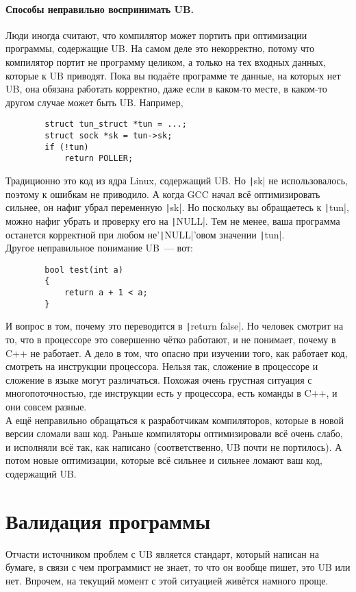 \documentclass{article}
\begin{document}
    \paragraph{Способы неправильно воспринимать UB.}
    Люди иногда считают, что компилятор может портить при оптимизации программы, содержащие UB. На самом деле это некорректно, потому что компилятор портит не программу целиком, а только на тех входных данных, которые к UB приводят. Пока вы подаёте программе те данные, на которых нет UB, она обязана работать корректно, даже если в каком-то месте, в каком-то другом случае может быть UB. Например,
    \begin{verbatim}
        struct tun_struct *tun = ...;
        struct sock *sk = tun->sk;
        if (!tun)
            return POLLER;
    \end{verbatim}
    Традиционно это код из ядра Linux, содержащий UB. Но \texttt|sk| не использовалось, поэтому к ошибкам не приводило. А когда GCC начал всё оптимизировать сильнее, он нафиг убрал переменную \texttt|sk|. Но поскольку вы обращаетесь к \texttt|tun|, можно нафиг убрать и проверку его на \texttt|NULL|. Тем не менее, ваша программа останется корректной при любом не'\texttt|NULL|'овом значении \texttt|tun|.\\
    Другое неправильное понимание UB~--- вот:
    \begin{verbatim}
        bool test(int a)
        {
            return a + 1 < a;
        }
    \end{verbatim}
    И вопрос в том, почему это переводится в \texttt|return false|. Но человек смотрит на то, что в процессоре это совершенно чётко работают, и не понимает, почему в C++ не работает. А дело в том, что опасно при изучении того, как работает код, смотреть на инструкции процессора. Нельзя так, сложение в процессоре и сложение в языке могут различаться. Похожая очень грустная ситуация с многопоточностью, где инструкции есть у процессора, есть команды в C++, и они совсем разные.\\
    А ещё неправильно обращаться к разработчикам компиляторов, которые в новой версии сломали ваш код. Раньше компиляторы оптимизировали всё очень слабо, и исполняли всё так, как написано (соответственно, UB почти не портилось). А потом новые оптимизации, которые всё сильнее и сильнее ломают ваш код, содержащий UB.
    \section{Валидация программы}
    Отчасти источником проблем с UB является стандарт, который написан на бумаге, в связи с чем программист не знает, то что он вообще пишет, это UB или нет. Впрочем, на текущий момент с этой ситуацией живётся намного проще.
\end{document}

